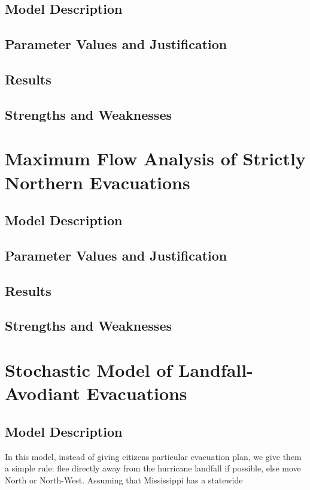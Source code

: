 \documentclass[titlepage]{article}
\begin{document}
  \subsection{Model Description}
  \subsection{Parameter Values and Justification}
  \subsection{Results}
  \subsection{Strengths and Weaknesses}

\section{Maximum Flow Analysis of Strictly Northern Evacuations}
\label{sec:maxflow}
  \subsection{Model Description}
  \subsection{Parameter Values and Justification}
  \subsection{Results}
  \subsection{Strengths and Weaknesses}

\section{Stochastic Model of Landfall-Avodiant Evacuations}
\label{sec:stochastic}
  \subsection{Model Description}
    \par In this model, instead of giving citizens particular evacuation plan, we give them a simple rule: flee directly away from the hurricane landfall if possible, else move North or North-West. Assuming that Mississippi has a statewide
\end{document}

